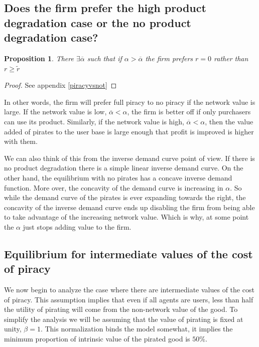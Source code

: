\documentclass[12pt]{article}
\newtheorem{proposition}{Proposition}
\numberwithin{equation}{section}
\begin{document}
\subsection{Does the firm prefer the high product degradation case or the no product degradation case? }

\begin{proposition}\label{piracyvsnotproposition}
There $ \exists \overline{\alpha} $ such that if $\alpha > \overline{\alpha}$ the firm prefers $r=0$ rather than $r \geq \tilde{r}$
\end{proposition}

\begin{proof}
See appendix \ref{piracyvsnot}
\end{proof}

In other words, the firm will prefer full piracy to no piracy if the network value is large. If the network value is low, $\overline{\alpha}<\alpha$, the firm is better off if only purchasers can use its product. Similarly, if the network value is high, $\overline{\alpha}<\alpha$, then the value added of pirates to the user base is large enough that profit is improved is higher with them. 

We can also think of this from the inverse demand curve point of view. If there is no product degradation there is a simple linear inverse demand curve. On the other hand, the equilibrium with no pirates has a concave inverse demand function. More over, the concavity of the demand curve is increasing in $\alpha$. So while the demand curve of the pirates is ever expanding towards the right, the concavity of the inverse demand curve ends up disabling the firm from being able to take advantage of the increasing network value. Which is why, at some point the $\alpha$ just stops adding value to the firm.



\subsection{ Equilibrium for intermediate values of the cost of piracy}


We now begin to analyze the case where there are intermediate values of the cost of piracy. This assumption implies that even if all agents are users, less than half the utility of pirating will come from the non-network value of the good. To simplify the analysis we will be assuming that the value of pirating is fixed at unity, $\beta = 1$. This normalization binds the model somewhat, it implies the minimum proportion of intrinsic value of the pirated good is $50\%$. 
\end{document}
